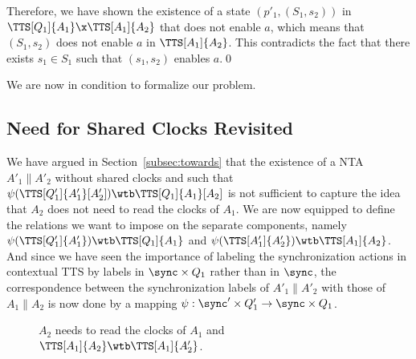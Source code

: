 \documentclass{LMCS}
\theoremstyle{plain}\newtheorem*{prop11}{Proposition~\ref{prop:states} bis}
\begin{document}
  Therefore, we have shown the existence of a state $(p'_1,(S_1,s_2))$ in
  $\TTS[Q_1]{A_1}\x\TTS[A_1]{A_2}$ that does not enable $a$, which means
  that $(S_1,s_2)$ does not enable $a$ in $\TTS[A_1]{A_2}$.
  This contradicts the fact that there exists $s_1\in S_1$ such that
  $(s_1,s_2)$ enables $a$.\qed

We are now in condition to formalize our problem.


\subsection{Need for Shared Clocks Revisited}\label{subsec:nsc}                We have argued in Section~\ref{subsec:towards} that the existence of a
NTA $A'_1 \parallel A'_2$ without shared clocks and such that
$\psi(\TTS[Q'_1]{A'_1}[A'_2])\wtb\TTS[Q_1]{A_1}[A_2]$ is not sufficient to
capture the idea that $A_2$ does not need to read the clocks of $A_1$.
We are now equipped to define the relations we want to impose
on the separate components, namely
$\psi(\TTS[Q'_1]{A'_1})\wtb\TTS[Q_1]{A_1}$ and
$\psi(\TTS[A'_1]{A'_2})\wtb\TTS[A_1]{A_2}$.
And since we have seen the importance of labeling the synchronization
actions in contextual TTS by labels in $\sync\times Q_1$ rather than in
$\sync$, the correspondence between the synchronization labels of $A'_1
\parallel A'_2$ with those of $A_1 \parallel A_2$ is now done by a mapping
$\psi: \sync'\times Q'_1 \rightarrow \sync\times Q_1$.

\begin{figure}[t]
  \centering
  \def\b{-0.4}
\def\c{2}
\def\d{1}
\def\a{\c+\d}
  \caption{$A_2$ needs to read the clocks of $A_1$ and
  $\TTS[A_1]{A_2}\wtb\TTS[A_1]{A'_2}$. \label{fig:bisim2}}
\end{figure}
\end{document}
